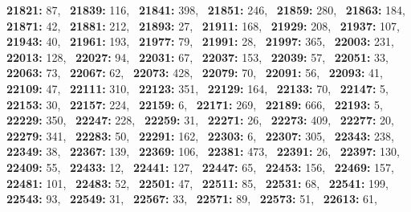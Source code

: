 \textbf{21821:} 87,\allowbreak~ 
\textbf{21839:} 116,\allowbreak~ 
\textbf{21841:} 398,\allowbreak~ 
\textbf{21851:} 246,\allowbreak~ 
\textbf{21859:} 280,\allowbreak~ 
\textbf{21863:} 184,\allowbreak~ 
\textbf{21871:} 42,\allowbreak~ 
\textbf{21881:} 212,\allowbreak~ 
\textbf{21893:} 27,\allowbreak~ 
\textbf{21911:} 168,\allowbreak~ 
\textbf{21929:} 208,\allowbreak~ 
\textbf{21937:} 107,\allowbreak~ 
\textbf{21943:} 40,\allowbreak~ 
\textbf{21961:} 193,\allowbreak~ 
\textbf{21977:} 79,\allowbreak~ 
\textbf{21991:} 28,\allowbreak~ 
\textbf{21997:} 365,\allowbreak~ 
\textbf{22003:} 231,\allowbreak~ 
\textbf{22013:} 128,\allowbreak~ 
\textbf{22027:} 94,\allowbreak~ 
\textbf{22031:} 67,\allowbreak~ 
\textbf{22037:} 153,\allowbreak~ 
\textbf{22039:} 57,\allowbreak~ 
\textbf{22051:} 33,\allowbreak~ 
\textbf{22063:} 73,\allowbreak~ 
\textbf{22067:} 62,\allowbreak~ 
\textbf{22073:} 428,\allowbreak~ 
\textbf{22079:} 70,\allowbreak~ 
\textbf{22091:} 56,\allowbreak~ 
\textbf{22093:} 41,\allowbreak~ 
\textbf{22109:} 47,\allowbreak~ 
\textbf{22111:} 310,\allowbreak~ 
\textbf{22123:} 351,\allowbreak~ 
\textbf{22129:} 164,\allowbreak~ 
\textbf{22133:} 70,\allowbreak~ 
\textbf{22147:} 5,\allowbreak~ 
\textbf{22153:} 30,\allowbreak~ 
\textbf{22157:} 224,\allowbreak~ 
\textbf{22159:} 6,\allowbreak~ 
\textbf{22171:} 269,\allowbreak~ 
\textbf{22189:} 666,\allowbreak~ 
\textbf{22193:} 5,\allowbreak~ 
\textbf{22229:} 350,\allowbreak~ 
\textbf{22247:} 228,\allowbreak~ 
\textbf{22259:} 31,\allowbreak~ 
\textbf{22271:} 26,\allowbreak~ 
\textbf{22273:} 409,\allowbreak~ 
\textbf{22277:} 20,\allowbreak~ 
\textbf{22279:} 341,\allowbreak~ 
\textbf{22283:} 50,\allowbreak~ 
\textbf{22291:} 162,\allowbreak~ 
\textbf{22303:} 6,\allowbreak~ 
\textbf{22307:} 305,\allowbreak~ 
\textbf{22343:} 238,\allowbreak~ 
\textbf{22349:} 38,\allowbreak~ 
\textbf{22367:} 139,\allowbreak~ 
\textbf{22369:} 106,\allowbreak~ 
\textbf{22381:} 473,\allowbreak~ 
\textbf{22391:} 26,\allowbreak~ 
\textbf{22397:} 130,\allowbreak~ 
\textbf{22409:} 55,\allowbreak~ 
\textbf{22433:} 12,\allowbreak~ 
\textbf{22441:} 127,\allowbreak~ 
\textbf{22447:} 65,\allowbreak~ 
\textbf{22453:} 156,\allowbreak~ 
\textbf{22469:} 157,\allowbreak~ 
\textbf{22481:} 101,\allowbreak~ 
\textbf{22483:} 52,\allowbreak~ 
\textbf{22501:} 47,\allowbreak~ 
\textbf{22511:} 85,\allowbreak~ 
\textbf{22531:} 68,\allowbreak~ 
\textbf{22541:} 199,\allowbreak~ 
\textbf{22543:} 93,\allowbreak~ 
\textbf{22549:} 31,\allowbreak~ 
\textbf{22567:} 33,\allowbreak~ 
\textbf{22571:} 89,\allowbreak~ 
\textbf{22573:} 51,\allowbreak~ 
\textbf{22613:} 61,\allowbreak~ 
